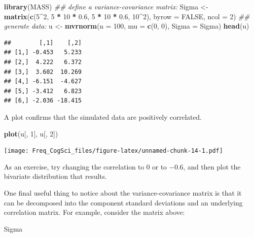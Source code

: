 \documentclass[12pt,]{krantz}
\newenvironment{Shaded}{\begin{snugshade}}{\end{snugshade}}
\newcommand{\CommentTok}[1]{\textcolor[rgb]{0.56,0.35,0.01}{\textit{#1}}}
\newcommand{\DataTypeTok}[1]{\textcolor[rgb]{0.13,0.29,0.53}{#1}}
\newcommand{\DecValTok}[1]{\textcolor[rgb]{0.00,0.00,0.81}{#1}}
\newcommand{\FloatTok}[1]{\textcolor[rgb]{0.00,0.00,0.81}{#1}}
\newcommand{\KeywordTok}[1]{\textcolor[rgb]{0.13,0.29,0.53}{\textbf{#1}}}
\newcommand{\NormalTok}[1]{#1}
\newcommand{\OperatorTok}[1]{\textcolor[rgb]{0.81,0.36,0.00}{\textbf{#1}}}
\newcommand{\OtherTok}[1]{\textcolor[rgb]{0.56,0.35,0.01}{#1}}
\newcommand{\StringTok}[1]{\textcolor[rgb]{0.31,0.60,0.02}{#1}}
\begin{document}
\begin{Shaded}
\begin{Highlighting}[]
\KeywordTok{library}\NormalTok{(MASS)}
\CommentTok{## define a variance-covariance matrix:}
\NormalTok{Sigma <-}\StringTok{ }\KeywordTok{matrix}\NormalTok{(}\KeywordTok{c}\NormalTok{(}\DecValTok{5}\OperatorTok{^}\DecValTok{2}\NormalTok{, }\DecValTok{5} \OperatorTok{*}\StringTok{ }\DecValTok{10} \OperatorTok{*}\StringTok{ }\FloatTok{0.6}\NormalTok{, }\DecValTok{5} \OperatorTok{*}\StringTok{ }\DecValTok{10} \OperatorTok{*}\StringTok{ }\FloatTok{0.6}\NormalTok{, }
  \DecValTok{10}\OperatorTok{^}\DecValTok{2}\NormalTok{), }\DataTypeTok{byrow =} \OtherTok{FALSE}\NormalTok{, }\DataTypeTok{ncol =} \DecValTok{2}\NormalTok{)}
\CommentTok{## generate data:}
\NormalTok{u <-}\StringTok{ }\KeywordTok{mvrnorm}\NormalTok{(}\DataTypeTok{n =} \DecValTok{100}\NormalTok{, }\DataTypeTok{mu =} \KeywordTok{c}\NormalTok{(}\DecValTok{0}\NormalTok{, }\DecValTok{0}\NormalTok{), }\DataTypeTok{Sigma =}\NormalTok{ Sigma)}
\KeywordTok{head}\NormalTok{(u)}
\end{Highlighting}
\end{Shaded}

\begin{verbatim}
##        [,1]    [,2]
## [1,] -0.453   5.233
## [2,]  4.222   6.372
## [3,]  3.602  10.269
## [4,] -6.151  -4.627
## [5,] -3.412   6.823
## [6,] -2.036 -18.415
\end{verbatim}

A plot confirms that the simulated data are positively correlated.

\begin{Shaded}
\begin{Highlighting}[]
\KeywordTok{plot}\NormalTok{(u[, }\DecValTok{1}\NormalTok{], u[, }\DecValTok{2}\NormalTok{])}
\end{Highlighting}
\end{Shaded}

\texttt{[image: Freq\_CogSci\_files/figure-latex/unnamed-chunk-14-1.pdf]}

As an exercise, try changing the correlation to \(0\) or to \(-0.6\), and then plot the bivariate distribution that results.

One final useful thing to notice about the variance-covariance matrix is that it can be decomposed into the component standard deviations and an underlying correlation matrix. For example, consider the matrix above:

\begin{Shaded}
\begin{Highlighting}[]
\NormalTok{Sigma}
\end{Highlighting}
\end{Shaded}
\end{document}

